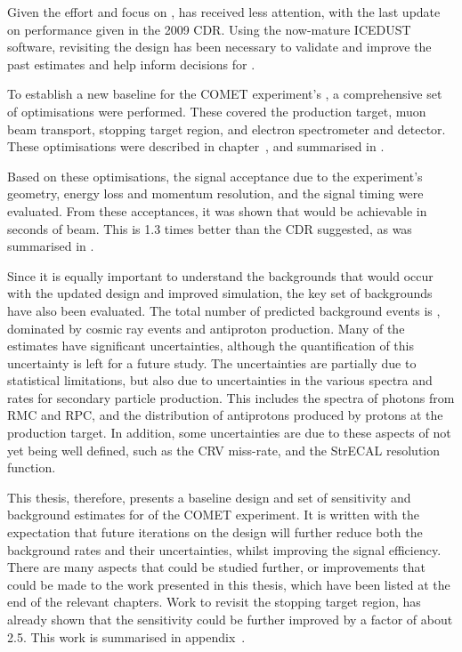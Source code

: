Given the effort and focus on \phaseI,  \phaseII has received less attention, with the last update on performance given in the 2009 CDR.
Using the now-mature ICEDUST software, revisiting the \phaseII design has been necessary to validate and improve the past estimates and help inform decisions for \phaseI.

To establish a new baseline for the COMET experiment's \phaseII, a comprehensive set of optimisations were performed.
These covered the production target, muon beam transport, stopping target region, and electron spectrometer and detector.
These optimisations were described in chapter~, and summarised in .

Based on these optimisations, the signal acceptance due to the experiment's geometry, energy loss and momentum resolution, and the signal timing were evaluated.
From these acceptances, it was shown that \VarPredictedSES would be achievable in \VarRunTime seconds of beam.
This is 1.3 times better than the \phaseII CDR suggested, as was summarised in .

Since it is equally important to understand the backgrounds that would occur with the updated design and improved simulation, 
the key set of backgrounds have also been evaluated.
The total number of predicted background events is \VarTotalBgPhasII, dominated by cosmic ray events and antiproton production.
Many of the estimates have significant uncertainties, although the quantification of this uncertainty is left for a future study.
The uncertainties are partially due to statistical limitations, but also due to uncertainties in the various spectra and rates for secondary particle production.
This includes the spectra of photons from \acl{RMC} and \acl{RPC}, and the distribution of antiprotons produced by protons at the production target.
In addition, some uncertainties are due to these aspects of \phaseII not yet being well defined, such as the \ac{CRV} miss-rate, and the StrECAL resolution function.

This thesis, therefore, presents a baseline design and set of sensitivity and background estimates for \phaseII of the COMET experiment.
It is written with the expectation that future iterations on the design will further reduce both the background rates and their uncertainties, whilst improving the signal efficiency.
There are many aspects that could be studied further, or improvements that could be made to the work presented in this thesis, which have been listed at the end of the relevant chapters.
Work to revisit the stopping target region,  has already shown that the sensitivity could be further improved by a factor of about 2.5.
This work is summarised in appendix~.

